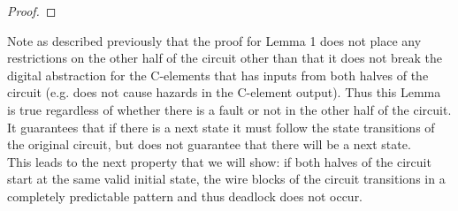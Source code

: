 \documentclass[12pt]{report}
\begin{document}
\begin{proof}

\end{proof}

Note as described previously that the proof for Lemma 1 does not place any restrictions on the other half of the circuit other than that it does not break the digital abstraction for the C-elements that has inputs from both halves of the circuit (e.g. does not cause hazards in the C-element output).  Thus this Lemma is true regardless of whether there is a fault or not in the other half of the circuit.  It guarantees that if there is a next state it must follow the state transitions of the original circuit, but does not guarantee that there will be a next state.\\  %

This leads to the next property that we will show: if both halves of the circuit start at the same valid initial state, the wire blocks of the circuit transitions in a completely predictable pattern and thus deadlock does not occur.
\end{document}
